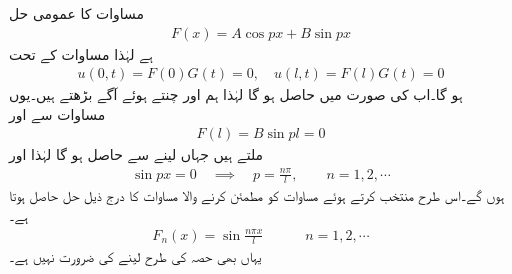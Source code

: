 \quad مساوات  کا عمومی حل
\begin{align}\label{مساوات_جزوی_حل_حرارت_ٹ}
F(x)=A\cos px+B\sin px
\end{align}
ہے لہٰذا مساوات  کے تحت
\begin{align*}
u(0,t)=F(0)G(t)=0,\quad u(l,t)=F(l)G(t)=0
\end{align*}
ہو گا۔اب  کی صورت میں    حاصل ہو گا لہٰذا ہم  اور  چنتے ہوئے آگے بڑھتے ہیں۔یوں مساوات  سے  اور
\begin{align*}
F(l)=B\sin pl=0
\end{align*}
ملتے ہیں جہاں  لینے سے  حاصل ہو گا لہٰذا  اور 
\begin{align*}
\sin px=0\quad \implies \quad p=\frac{n\pi}{l}, \quad \quad n=1,2,\cdots 
\end{align*}
ہوں گے۔اس طرح  منتخب  کرتے ہوئے مساوات  کو مطمئن کرنے والا مساوات  کا درج ذیل حل  حاصل ہوتا ہے۔
\begin{align*}
F_n(x)=\sin \frac{n\pi x}{l}\quad \quad \quad n=1,2,\cdots
\end{align*}
یہاں بھی حصہ  کی طرح  لینے کی ضرورت نہیں ہے۔

